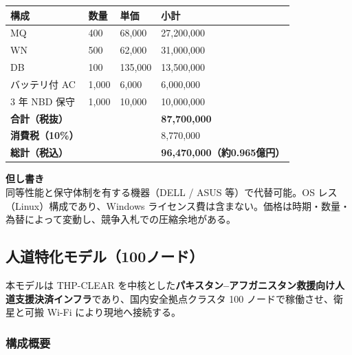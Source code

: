 \documentclass[
]{article}
\begin{document}
\begin{longtable}[]{@{}llll@{}}
\toprule\noalign{}
構成 & 数量 & 単価 & 小計 \\
\midrule\noalign{}
\endhead
\bottomrule\noalign{}
\endlastfoot
MQ & 400 & 68,000 & 27,200,000 \\
WN & 500 & 62,000 & 31,000,000 \\
DB & 100 & 135,000 & 13,500,000 \\
バッテリ付 AC & 1,000 & 6,000 & 6,000,000 \\
3 年 NBD 保守 & 1,000 & 10,000 & 10,000,000 \\
\textbf{合計（税抜）} & & & \textbf{87,700,000} \\
\textbf{消費税（10\%）} & & & 8,770,000 \\
\textbf{総計（税込）} & & & \textbf{96,470,000（約0.965億円）} \\
\end{longtable}

\textbf{但し書き}\\
同等性能と保守体制を有する機器（DELL / ASUS 等）で代替可能。OS
レス（Linux）構成であり、Windows
ライセンス費は含まない。価格は時期・数量・為替によって変動し、競争入札での圧縮余地がある。

\subsection{人道特化モデル（100ノード）}\label{ux4ebaux9053ux7279ux5316ux30e2ux30c7ux30eb100ux30ceux30fcux30c9}

本モデルは THP-CLEAR
を中核とした\textbf{パキスタン--アフガニスタン救援向け人道支援決済インフラ}であり、国内安全拠点クラスタ
100 ノードで稼働させ、衛星と可搬 Wi-Fi により現地へ接続する。

\subsubsection{構成概要}\label{ux69cbux6210ux6982ux8981}
\end{document}

